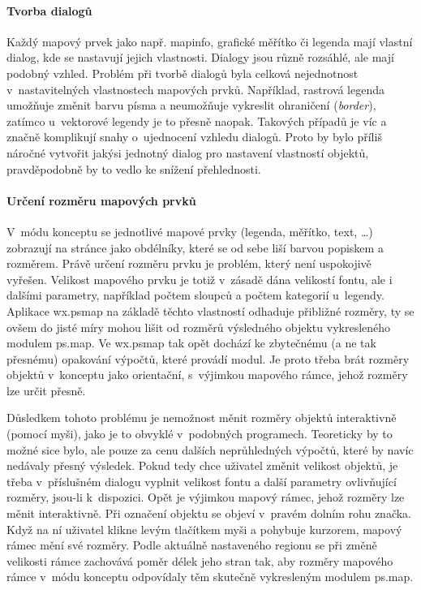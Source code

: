 \documentclass[a4paper,12pt,draft]{article}
\begin{document}
 \paragraph*{Tvorba dialogů}
 Každý mapový prvek jako např. mapinfo, grafické měřítko či legenda
 mají vlastní dialog, kde se nastavují jejich vlastnosti. Dialogy jsou
 různě rozsáhlé, ale mají podobný vzhled. Problém při tvorbě
 dialogů byla celková nejednotnost v~nastavitelných vlastnostech
 mapových prvků. Například, rastrová legenda umožňuje změnit barvu písma a
 neumožňuje vykreslit ohraničení (\emph{border}), zatímco u~vektorové
 legendy je to přesně naopak. Takových případů je víc a značně
 komplikují snahy o~ujednocení vzhledu dialogů. Proto by bylo příliš
 náročné vytvořit jakýsi jednotný dialog pro nastavení vlastností
 objektů, pravděpodobně by to vedlo ke snížení přehlednosti.

 \paragraph*{Určení rozměru mapových prvků}
 V~módu konceptu se jednotlivé mapové prvky (legenda, měřítko, text, \ldots)
zobrazují na
 stránce jako obdélníky, které se od sebe liší barvou popiskem
 a rozměrem. Právě určení rozměru prvku je problém, který není
 uspokojivě vyřešen. Velikost mapového prvku je totiž v~zásadě dána
 velikostí fontu, ale i dalšími parametry, například počtem sloupců
 a počtem kategorií u~legendy. Aplikace wx.psmap na základě těchto
 vlastností odhaduje přibližné rozměry, ty se ovšem do jisté míry
 mohou lišit od rozměrů výsledného objektu vykresleného modulem
 ps.map. Ve wx.psmap tak opět dochází ke zbytečnému (a ne
 tak přesnému) opakování výpočtů, které provádí modul. Je proto třeba brát
 rozměry objektů v~konceptu  jako orientační, s~výjimkou
 mapového rámce, jehož rozměry lze určit přesně.

 Důsledkem tohoto problému je nemožnost měnit rozměry objektů
 interaktivně (pomocí myši), jako je to obvyklé v~podobných
 programech. Teoreticky by to možné sice bylo, ale pouze za cenu
 dalších neprůhledných výpočtů, které by navíc nedávaly přesný
 výsledek. Pokud tedy chce uživatel změnit velikost objektů, je třeba
 v~přísluš\-ném dialogu vyplnit velikost fontu a další parametry
 ovlivňující rozměry, jsou-li k~dispozici. Opět je výjimkou mapový
 rámec, jehož rozměry lze měnit interaktivně. Při označení objektu
 se objeví v~pravém dolním rohu značka. Když na ní uživatel klikne levým
tlačítkem myši a pohybuje kurzorem, mapový rámec mění své rozměry. Podle
aktuálně nastaveného regionu se při změně velikosti rámce zachovává poměr délek
jeho stran tak, aby rozměry mapového rámce v~módu konceptu odpovídaly těm
skutečně vykresleným modulem ps.map.
\end{document}
